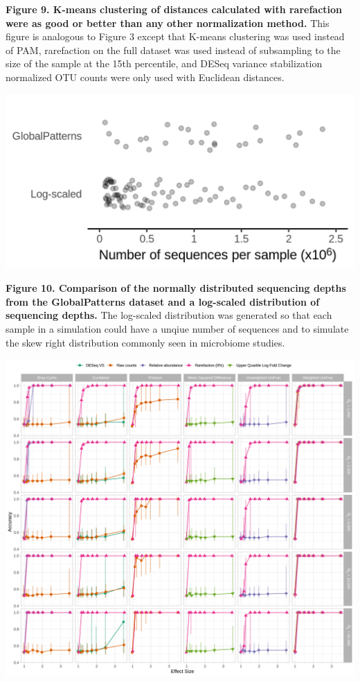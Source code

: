 \documentclass[
]{article}
\begin{document}
\textbf{Figure 9. K-means clustering of distances calculated with
rarefaction were as good or better than any other normalization method.}
This figure is analogous to Figure 3 except that K-means clustering was
used instead of PAM, rarefaction on the full dataset was used instead of
subsampling to the size of the sample at the 15th percentile, and DESeq
variance stabilization normalized OTU counts were only used with
Euclidean distances.

\newpage

\includegraphics{figure_10.png}

\textbf{Figure 10. Comparison of the normally distributed sequencing
depths from the GlobalPatterns dataset and a log-scaled distribution of
sequencing depths.} The log-scaled distribution was generated so that
each sample in a simulation could have a unqiue number of sequences and
to simulate the skew right distribution commonly seen in microbiome
studies.

\newpage

\includegraphics{figure_11.png}
\end{document}

